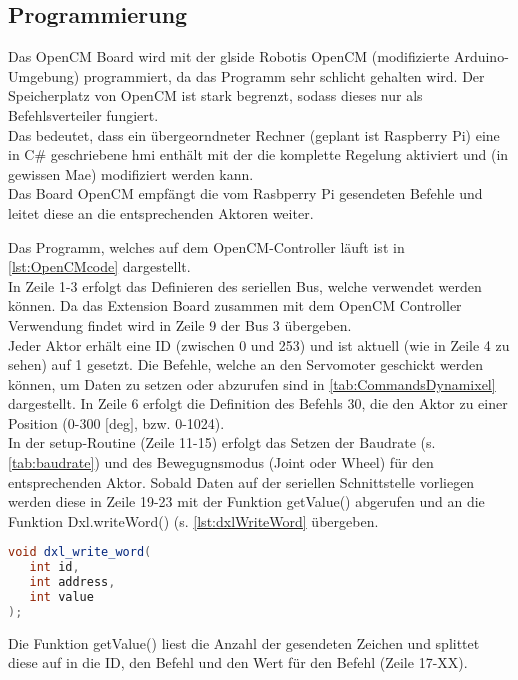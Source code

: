 \subsection{Programmierung}
Das OpenCM Board wird mit der gls{ide} Robotis OpenCM (modifizierte 
Arduino-Umgebung) programmiert, da das Programm sehr schlicht gehalten wird.
Der Speicherplatz von OpenCM ist stark begrenzt, sodass dieses nur als 
Befehlsverteiler fungiert.\\
Das bedeutet, dass ein übergeorndneter Rechner (geplant ist Raspberry Pi) eine 
in C\# geschriebene \gls{hmi} enthält mit der die komplette Regelung aktiviert 
und (in gewissen Mae) modifiziert werden kann.\\
Das Board OpenCM empfängt die vom Rasbperry Pi gesendeten Befehle und leitet 
diese an die entsprechenden Aktoren weiter.

Das Programm, welches auf dem OpenCM-Controller läuft ist in 
\ref{lst:OpenCMcode} dargestellt.\\
In Zeile 1-3 erfolgt das Definieren des seriellen Bus, welche verwendet werden 
können. Da das Extension Board zusammen mit dem OpenCM Controller Verwendung 
findet wird in Zeile 9 der Bus 3 übergeben.\\
Jeder Aktor erhält eine ID (zwischen 0 und 253) und ist aktuell (wie in Zeile 4 
zu sehen) auf 1 gesetzt. 
Die Befehle, welche an den Servomoter geschickt werden können, um Daten zu 
setzen oder abzurufen sind in \ref{tab:CommandsDynamixel} dargestellt. In Zeile 
6 erfolgt die Definition des Befehls 30, die den Aktor zu einer Position (0-300 
$[$deg$]$, bzw. 0-1024).\\
In der setup-Routine (Zeile 11-15) erfolgt das Setzen der Baudrate (s. 
\ref{tab:baudrate}) und des Bewegugnsmodus (Joint oder Wheel) für den 
entsprechenden Aktor. 
Sobald Daten auf der seriellen Schnittstelle vorliegen werden diese in Zeile 
19-23 mit der Funktion getValue() abgerufen und an die Funktion Dxl.writeWord() 
(s. \ref{lst:dxlWriteWord} übergeben.
\label{lst:dxlWriteWord}
\begin{lstlisting}[language=java, caption=Funktion dxlWriteWord]
void dxl_write_word(
   int id,
   int address,
   int value
);
\end{lstlisting}

Die Funktion getValue() liest die Anzahl der gesendeten Zeichen und splittet 
diese auf in die ID, den Befehl und den Wert für den Befehl (Zeile 17-XX).

